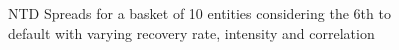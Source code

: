 \begin{figure}
{}
{}
\caption{\label{fig:BasketSpreads}NTD Spreads for a basket of 10 entities considering the 6th to default with varying recovery rate, intensity and correlation}
\end{figure}


